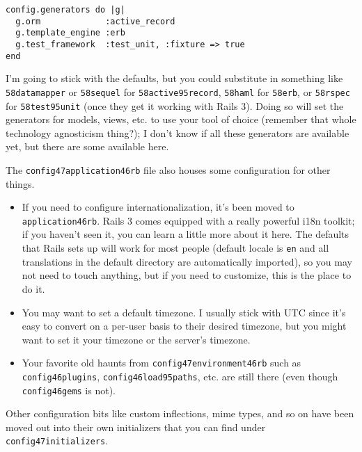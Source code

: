 \documentclass{book}
\begin{document}
\begin{verbatim}config.generators do |g|
  g.orm             :active_record
  g.template_engine :erb
  g.test_framework  :test_unit, :fixture => true
end\end{verbatim}
I'{}m going to stick with the defaults, but you could substitute in something like {\colorbox[rgb]{0.87,0.87,0.87}{\tt \char58datamapper}} or {\colorbox[rgb]{0.87,0.87,0.87}{\tt \char58sequel}} for {\colorbox[rgb]{0.87,0.87,0.87}{\tt \char58active\char95record}}, {\colorbox[rgb]{0.87,0.87,0.87}{\tt \char58haml}} for {\colorbox[rgb]{0.87,0.87,0.87}{\tt \char58erb}}, or {\colorbox[rgb]{0.87,0.87,0.87}{\tt \char58rspec}} for {\colorbox[rgb]{0.87,0.87,0.87}{\tt \char58test\char95unit}} (once they get it working with Rails 3). Doing so will set the generators for models, views, etc. to use your tool of choice (remember that whole technology agnosticism thing?); I don'{}t know if all these generators are available yet, but there are some available here.

The {\colorbox[rgb]{0.87,0.87,0.87}{\tt config\char47application\char46rb}} file also houses some configuration for other things.

\begin{itemize}%
\item If you need to configure internationalization, it'{}s been moved to {\colorbox[rgb]{0.87,0.87,0.87}{\tt application\char46rb}}. Rails 3 comes equipped with a really powerful i18n toolkit; if you haven'{}t seen it, you can learn a little more about it here. The defaults that Rails sets up will work for most people (default locale is {\colorbox[rgb]{0.87,0.87,0.87}{\tt en}} and all translations in the default directory are automatically imported), so you may not need to touch anything, but if you need to customize, this is the place to do it.
\item You may want to set a default timezone. I usually stick with UTC since it'{}s easy to convert on a per-user basis to their desired timezone, but you might want to set it your timezone or the server'{}s timezone.
\item Your favorite old haunts from {\colorbox[rgb]{0.87,0.87,0.87}{\tt config\char47environment\char46rb}} such as {\colorbox[rgb]{0.87,0.87,0.87}{\tt config\char46plugins}}, {\colorbox[rgb]{0.87,0.87,0.87}{\tt config\char46load\char95paths}}, etc. are still there (even though {\colorbox[rgb]{0.87,0.87,0.87}{\tt config\char46gems}} is not).

\end{itemize}
Other configuration bits like custom inflections, mime types, and so on have been moved out into their own initializers that you can find under {\colorbox[rgb]{0.87,0.87,0.87}{\tt config\char47initializers}}.
\end{document}
